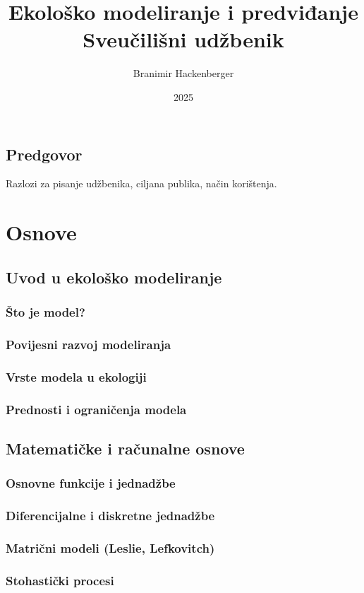 \documentclass[12pt,a4paper]{book}
\title{\Huge Ekološko modeliranje i predviđanje \\[1cm]
	\Large Sveučilišni udžbenik}
\author{Branimir Hackenberger}
\date{2025}
\begin{document}
	\maketitle
	\tableofcontents
	\chapter*{Predgovor}
	Razlozi za pisanje udžbenika, ciljana publika, način korištenja.
	
	
	\part{Osnove}
	\chapter{Uvod u ekološko modeliranje}
	\section{Što je model?}
	\section{Povijesni razvoj modeliranja}
	\section{Vrste modela u ekologiji}
	\section{Prednosti i ograničenja modela}
	
	\chapter{Matematičke i računalne osnove}
	\section{Osnovne funkcije i jednadžbe}
	\section{Diferencijalne i diskretne jednadžbe}
	\section{Matrični modeli (Leslie, Lefkovitch)}
	\section{Stohastički procesi}
\end{document}
